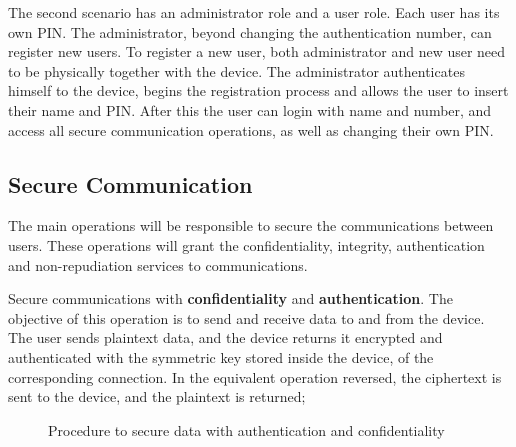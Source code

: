 The second scenario has an administrator role and a user role. Each user has its own \ac{PIN}. The administrator, beyond changing the authentication number, can register new users. To register a new user, both administrator and new user need to be physically together with the device. The administrator authenticates himself to the device, begins the registration process and allows the user to insert their name and \ac{PIN}. After this the user can login with name and number, and access all secure communication operations, as well as changing their own \ac{PIN}.

\subsection{Secure Communication}\label{chap:arch:ops:comms}

The main operations will be responsible to secure the communications between users. These operations will grant the confidentiality, integrity, authentication and non-repudiation services to communications.

Secure communications with \textbf{confidentiality} and \textbf{authentication}. The objective of this operation is to send and receive data to and from the device. The user sends plaintext data, and the device returns it encrypted and authenticated with the symmetric key stored inside the device, of the corresponding connection. In the equivalent operation reversed, the ciphertext is sent to the device, and the plaintext is returned;

\begin{figure}
	\centering     %
	\caption{Procedure to secure data with authentication and confidentiality}
\end{figure}

